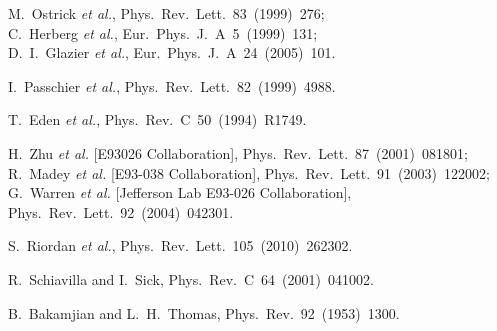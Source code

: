 \documentclass[preprint,aps,showpacs,floatfix]{revtex4}
\begin{document}
\begin{thebibliography}{99}
  M.~Ostrick {\it et al.},
  Phys.~Rev.~Lett.~83~(1999)~276;\\ 
  C.~Herberg {\it et al.},
  Eur.~Phys.~J.~A~5~(1999)~131;\\
  D.~I.~Glazier {\it et al.},
  Eur.~Phys.~J.~A~24~(2005)~101.  
  
  I.~Passchier {\it et al.},
  Phys.~Rev.~Lett.~82~(1999)~4988. 

  T.~Eden {\it et al.},
  Phys.~Rev.~C~50~(1994)~R1749. 
  
  H.~Zhu {\it et al.}  [E93026 Collaboration],
  Phys.~Rev.~Lett.~87~(2001)~081801;\\
  R.~Madey {\it et al.}  [E93-038 Collaboration],
  Phys.~Rev.~Lett.~91~(2003)~122002;\\
  G.~Warren {\it et al.}  [Jefferson Lab E93-026 Collaboration],
  Phys.~Rev.~Lett.~92~(2004)~042301.    
  
  S.~Riordan {\it et al.},
  Phys.~Rev.~Lett.~105~(2010)~262302.  


  R.~Schiavilla and I.~Sick,
  Phys.~Rev.~C~64~(2001)~041002.  
  
  B.~Bakamjian and L.~H.~Thomas,
  Phys.~Rev.~92~(1953)~1300.

  
  

  
\end{thebibliography}
\end{document}
